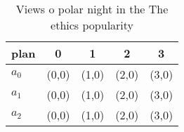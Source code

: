 \documentclass[a4paper]{article}
\begin{document}
\begin{table}
\begin{adjustbox}{width=0.5\columnwidth}
\begin{tabular}{|l|l|l|l|l|}
\hline
\textbf{plan} & \multicolumn{1}{c|}{\textbf{0}} & \multicolumn{1}{c|}{\textbf{1}} & \multicolumn{1}{c|}{\textbf{2}} & \multicolumn{1}{c|}{\textbf{3}} \\ \hline
\textbf{$a_0$}  & (0,0) & (1,0) & (2,0) & (3,0) \\ \hline
\textbf{$a_1$}  & (0,0) & (1,0) & (2,0) & (3,0) \\ \hline
\textbf{$a_2$}  & (0,0) & (1,0) & (2,0) & (3,0) \\ \hline
\end{tabular}
\end{adjustbox}
\caption{Views o polar night in the The ethics popularity 
}
\end{table}
\end{document}
